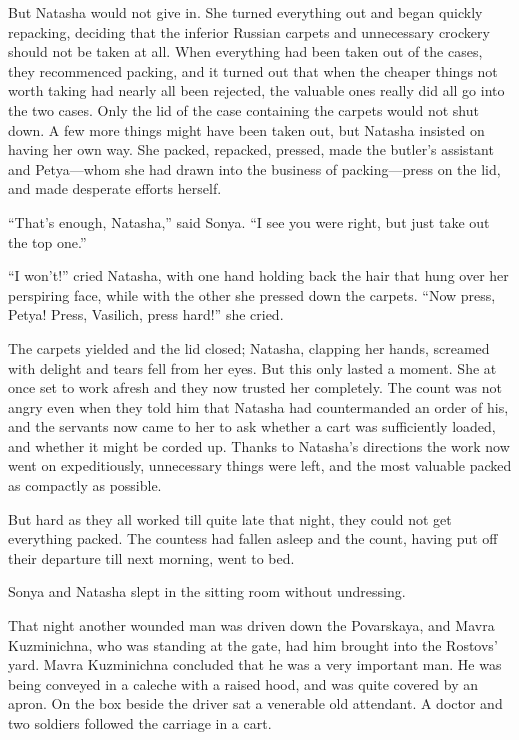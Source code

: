 But Natasha would not give in. She turned everything out and
began quickly repacking, deciding that the inferior Russian
carpets and unnecessary crockery should not be taken at all. When
everything had been taken out of the cases, they recommenced
packing, and it turned out that when the cheaper things not worth
taking had nearly all been rejected, the valuable ones really did
all go into the two cases. Only the lid of the case containing
the carpets would not shut down. A few more things might have
been taken out, but Natasha insisted on having her own way. She
packed, repacked, pressed, made the butler's assistant and
Petya---whom she had drawn into the business of packing---press
on the lid, and made desperate efforts herself.

``That's enough, Natasha,'' said Sonya. ``I see you were right,
but just take out the top one.''

``I won't!'' cried Natasha, with one hand holding back the hair
that hung over her perspiring face, while with the other she
pressed down the carpets. ``Now press, Petya! Press, Vasilich,
press hard!'' she cried.

The carpets yielded and the lid closed; Natasha, clapping her
hands, screamed with delight and tears fell from her eyes. But
this only lasted a moment. She at once set to work afresh and
they now trusted her completely. The count was not angry even
when they told him that Natasha had countermanded an order of
his, and the servants now came to her to ask whether a cart was
sufficiently loaded, and whether it might be corded up. Thanks to
Natasha's directions the work now went on expeditiously,
unnecessary things were left, and the most valuable packed as
compactly as possible.

But hard as they all worked till quite late that night, they
could not get everything packed. The countess had fallen asleep
and the count, having put off their departure till next morning,
went to bed.

Sonya and Natasha slept in the sitting room without undressing.

That night another wounded man was driven down the Povarskaya,
and Mavra Kuzminichna, who was standing at the gate, had him
brought into the Rostovs' yard. Mavra Kuzminichna concluded that
he was a very important man. He was being conveyed in a caleche
with a raised hood, and was quite covered by an apron. On the box
beside the driver sat a venerable old attendant. A doctor and two
soldiers followed the carriage in a cart.

